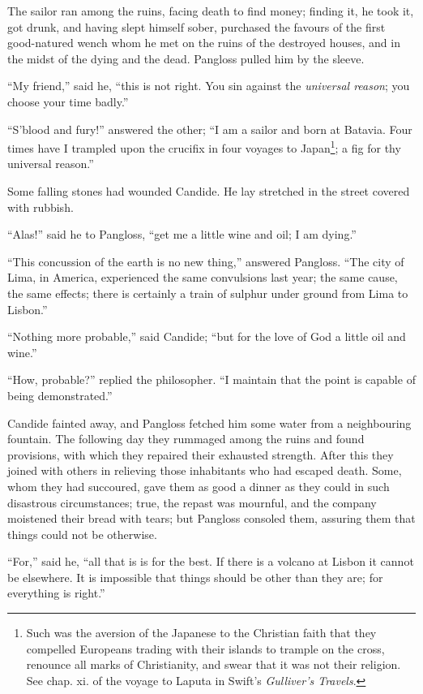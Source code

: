 The sailor ran among the ruins, facing death to find money; finding it, he took it, got drunk, and having slept himself sober, purchased the favours of the first good-natured wench whom he met on the ruins of the destroyed houses, and in the midst of the dying and the dead. Pangloss pulled him by the sleeve.

``My friend,'' said he, ``this is not right. You sin against the \textit{universal reason}; you choose your time badly.''

``S'blood and fury!'' answered the other; ``I am a sailor and born at Batavia. Four times have I trampled upon the crucifix in four voyages to Japan\footnote{Such was the aversion of the Japanese to the Christian faith that they compelled Europeans trading with their islands to trample on the cross, renounce all marks of Christianity, and swear that it was not their religion. See chap. xi. of the voyage to Laputa in Swift's \textit{Gulliver's Travels}.}; a fig for thy universal reason.''

Some falling stones had wounded Candide. He lay stretched in the street covered with rubbish.

``Alas!'' said he to Pangloss, ``get me a little wine and oil; I am dying.''

``This concussion of the earth is no new thing,'' answered Pangloss. ``The city of Lima, in America, experienced the same convulsions last year; the same cause, the same effects; there is certainly a train of sulphur under ground from Lima to Lisbon.''

``Nothing more probable,'' said Candide; ``but for the love of God a little oil and wine.''

``How, probable?'' replied the philosopher. ``I maintain that the point is capable of being demonstrated.''

Candide fainted away, and Pangloss fetched him some water from a neighbouring fountain. The following day they rummaged among the ruins and found provisions, with which they repaired their exhausted strength. After this they joined with others in relieving those inhabitants who had escaped death. Some, whom they had succoured, gave them as good a dinner as they could in such disastrous circumstances; true, the repast was mournful, and the company moistened their bread with tears; but Pangloss consoled them, assuring them that things could not be otherwise.

``For,'' said he, ``all that is is for the best. If there is a volcano at Lisbon it cannot be elsewhere. It is impossible that things should be other than they are; for everything is right.''

